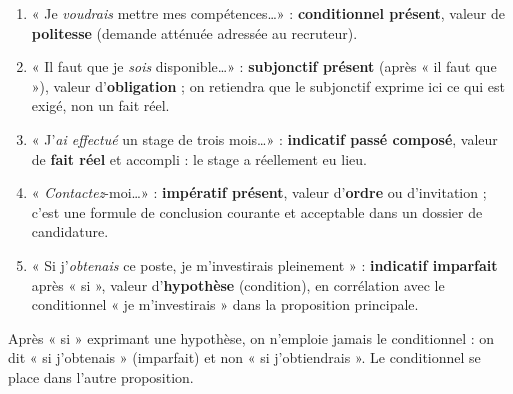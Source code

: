 \documentclass[11pt]{article}
\begin{document}
\begin{corrige}
\begin{enumerate}
\item « Je \emph{voudrais} mettre mes compétences\ldots » : \textbf{conditionnel présent}, valeur de \textbf{politesse} (demande atténuée adressée au recruteur).
\item « Il faut que je \emph{sois} disponible\ldots » : \textbf{subjonctif présent} (après « il faut que »), valeur d'\textbf{obligation} ; on retiendra que le subjonctif exprime ici ce qui est exigé, non un fait réel.
\item « J'\emph{ai effectué} un stage de trois mois\ldots » : \textbf{indicatif passé composé}, valeur de \textbf{fait réel} et accompli : le stage a réellement eu lieu.
\item « \emph{Contactez}-moi\ldots » : \textbf{impératif présent}, valeur d'\textbf{ordre} ou d'invitation ; c'est une formule de conclusion courante et acceptable dans un dossier de candidature.
\item « Si j'\emph{obtenais} ce poste, je m'investirais pleinement » : \textbf{indicatif imparfait} après « si », valeur d'\textbf{hypothèse} (condition), en corrélation avec le conditionnel « je m'investirais » dans la proposition principale.
\end{enumerate}
\end{corrige}

\begin{attention}
Après « si » exprimant une hypothèse, on n'emploie jamais le conditionnel : on dit « si j'obtenais » (imparfait) et non « si j'obtiendrais ». Le conditionnel se place dans l'autre proposition.
\end{attention}
\end{document}
